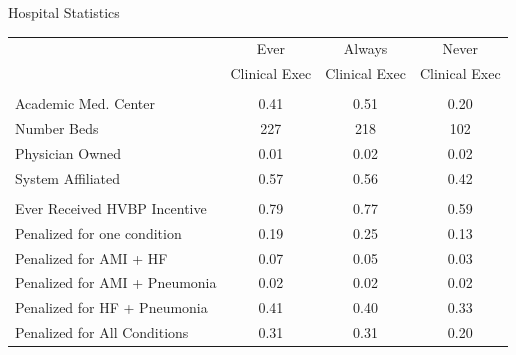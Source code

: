 \documentclass[notes,11pt, aspectratio=169]{beamer}
\begin{document}
\begin{frame}{Hospital Statistics}\label{sumstats}
\vspace{-3mm}
\begin{table}[ht!]
\centering
\begin{tabular}[t]{lccc}
 & Ever & Always & Never\\
  & Clinical Exec &Clinical Exec &Clinical Exec\\
\midrule
\addlinespace[0.3em]
\multicolumn{4}{l}{\textbf{Hospital Characteristics}}\\
\hspace{1em}Academic Med. Center & 0.41 & 0.51 & 0.20\\
\hspace{1em}Number Beds & 227 & 218 & 102\\
\hspace{1em}Physician Owned & 0.01 & 0.02 & 0.02\\
\hspace{1em}System Affiliated & 0.57 & 0.56 & 0.42\\
\addlinespace[0.3em]
\multicolumn{4}{l}{\textbf{Penalty/Payment Variables}}\\
\hspace{1em}Ever Received HVBP Incentive & 0.79 & 0.77 & 0.59\\
\hspace{1em}Penalized for one condition & 0.19 & 0.25 & 0.13\\
\hspace{1em}Penalized for AMI + HF & 0.07 & 0.05 & 0.03\\
\hspace{1em}Penalized for AMI + Pneumonia & 0.02 & 0.02 & 0.02\\
\hspace{1em}Penalized for HF + Pneumonia & 0.41 & 0.40 & 0.33\\
\hspace{1em}Penalized for All Conditions & 0.31 & 0.31 & 0.20\\
\bottomrule
\end{tabular}
\end{table}
\hyperlink{forprofitstats}{}
\end{frame}
\end{document}
